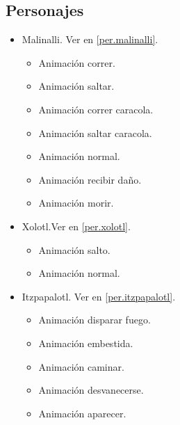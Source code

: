 \begin{itemize}
        \subsection{Personajes}
        \begin{itemize}
                \item Malinalli. Ver en \ref{per.malinalli}.
                \begin{itemize}
                        \item Animación correr.
                        \item Animación saltar.
                        \item Animación correr caracola.
                        \item Animación saltar caracola.
                        \item Animación normal.
                        \item Animación recibir daño.
						\item Animación morir.
                \end{itemize}
                \item Xolotl.Ver en \ref{per.xolotl}.
                	\begin{itemize}
						\item Animación salto.
						\item Animación normal.
					\end{itemize}
                \item Itzpapalotl. Ver en \ref{per.itzpapalotl}.
                \begin{itemize}
                        \item Animación disparar fuego.
                        \item Animación embestida.
                        \item Animación caminar.
                        \item Animación desvanecerse.
                        \item Animación aparecer.
                \end{itemize}
        \end{itemize}

\end{itemize}
